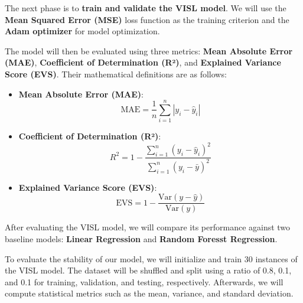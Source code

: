 \documentclass[11pt]{article}
\begin{document}
    The next phase is to \textbf{train and validate the VISL model}. We will
use the \textbf{Mean Squared Error (MSE)} loss function as the training
criterion and the \textbf{Adam optimizer} for model optimization.

The model will then be evaluated using three metrics: \textbf{Mean
Absolute Error (MAE)}, \textbf{Coefficient of Determination (R²)}, and
\textbf{Explained Variance Score (EVS)}. Their mathematical definitions
are as follows:

\begin{itemize}
\item
  \textbf{Mean Absolute Error (MAE)}:\\
  \[\text{MAE} = \frac{1}{n} \sum_{i=1}^{n} \left| y_i - \hat{y}_i \right|\]
\item
  \textbf{Coefficient of Determination (R²)}:\\
  \[R^2 = 1 - \frac{\sum_{i=1}^{n} \left( y_i - \hat{y}_i \right)^2}{\sum_{i=1}^{n} \left( y_i - \bar{y} \right)^2}\]
\item
  \textbf{Explained Variance Score (EVS)}:\\
  \[\text{EVS} = 1 - \frac{\text{Var}(y - \hat{y})}{\text{Var}(y)}\]
\end{itemize}

After evaluating the VISL model, we will compare its performance against
two baseline models: \textbf{Linear Regression} and \textbf{Random
Foresst Regression}.

    To evaluate the stability of our model, we will initialize and train 30
instances of the VISL model. The dataset will be shuffled and split
using a ratio of 0.8, 0.1, and 0.1 for training, validation, and
testing, respectively. Afterwards, we will compute statistical metrics
such as the mean, variance, and standard deviation.
\end{document}
